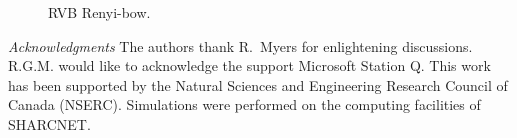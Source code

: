 \documentclass[prl,aps,twocolumn,floatfix,amsmath,amssymb,superscriptaddress,tightenlines]{revtex4}
\begin{document}
 \begin{figure}[ht]
   \begin{center}
   \end{center}
   \caption{RVB Renyi-bow. }
   \label{fig:2}
 \end{figure}

{\it Acknowledgments} 
The authors thank R.~Myers for enlightening discussions. 
R.G.M. would like to acknowledge the support Microsoft Station Q.
This work has been supported by the Natural Sciences and Engineering Research Council of Canada (NSERC).  Simulations were performed on the computing facilities of SHARCNET.



\end{document}
